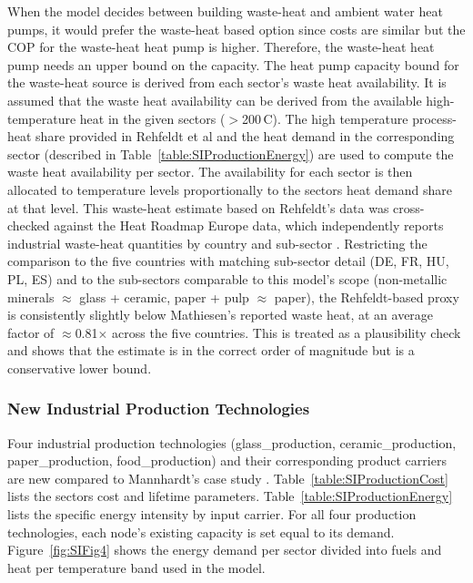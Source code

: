 When the model decides between building waste-heat and ambient water heat pumps, it would prefer the waste-heat based option since costs are similar but the COP for the waste-heat heat pump is higher. Therefore, the waste-heat heat pump needs an upper bound on the capacity. The heat pump capacity bound for the waste-heat source is derived from each sector's waste heat availability. It is assumed that the waste heat availability can be derived from the available high-temperature heat in the given sectors ($>$200\,\degree C). The high temperature process-heat share provided in Rehfeldt et al \cite{Rehfeldt2017} and the heat demand in the corresponding sector (described in Table~\ref{table:SIProductionEnergy}) are used to compute the waste heat availability per sector. The availability for each sector is then allocated to temperature levels proportionally to the sectors heat demand share at that level. This waste-heat estimate based on Rehfeldt's data was cross-checked against the Heat Roadmap Europe data, which independently reports industrial waste-heat quantities by country and sub-sector \cite{Mathiesen2026}. Restricting the comparison to the five countries with matching sub-sector detail (DE, FR, HU, PL, ES) and to the sub-sectors comparable to this model's scope (non-metallic minerals $\approx$ glass + ceramic, paper + pulp $\approx$ paper), the Rehfeldt-based proxy is consistently slightly below Mathiesen's reported waste heat, at an average factor of $\approx$0.81$\times$ across the five countries. This is treated as a plausibility check and shows that the estimate is in the correct order of magnitude but is a conservative lower bound. 

\subsubsection{New Industrial Production Technologies}
\label{sec:si-industry-tech}

Four industrial production technologies (glass\_\allowbreak production, ceramic\_\allowbreak production, paper\_\allowbreak production, food\_\allowbreak production) and their corresponding product carriers are new compared to Mannhardt's case study \cite{Mannhardt2026}. Table~\ref{table:SIProductionCost} lists the sectors cost and lifetime parameters. Table~\ref{table:SIProductionEnergy} lists the specific energy intensity by input carrier. For all four production technologies, each node's existing capacity is set equal to its demand. Figure~\ref{fig:SIFig4} shows the energy demand per sector divided into fuels and heat per temperature band used in the model. 

